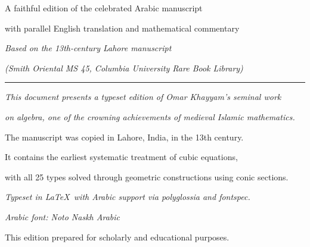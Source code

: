 \begin{titlepage}
\begin{center}
{\large A faithful edition of the celebrated Arabic manuscript}

\vspace{0.3cm}

{\normalsize with parallel English translation and mathematical commentary}

\vspace{2cm}

{\small
\textit{Based on the 13th-century Lahore manuscript}}

\vspace{0.2cm}

{\small
\textit{(Smith Oriental MS 45, Columbia University Rare Book Library)}}

\vspace{1cm}

{
\color{titlecolor}
\rule{\textwidth}{1.5pt}}

\end{center}

\end{titlepage}



\thispagestyle{empty}
\vspace*{10cm}

\begin{center}

{\small
\textit{This document presents a typeset edition of Omar Khayyam's seminal work}}

{\small
\textit{on algebra, one of the crowning achievements of medieval Islamic mathematics.}}

\vspace{0.5cm}
{\small The manuscript was copied in Lahore, India, in the 13th century.}

{\small It contains the earliest systematic treatment of cubic equations,}

{\small with all 25 types solved through geometric constructions using conic sections.}

\vspace{0.5cm}

{\small
\textit{Typeset in \LaTeX\ with Arabic support via polyglossia and fontspec.}}

{\small
\textit{Arabic font: Noto Naskh Arabic}}

\vspace{0.5cm}

{\footnotesize This edition prepared for scholarly and educational purposes.}

\end{center}

